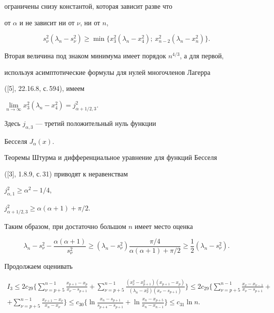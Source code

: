 ограничены снизу константой, которая зависит разве что 


от $\alpha$ и не зависит ни от $\nu$, ни от $n$,


$$


s^2_\nu(\lambda_n-s^2_\nu)\geq\min\{ 


x^2_3(\lambda_n-x^2_4);\ x^2_{n-2}(\lambda_n-x^2_n)\}.


$$


Вторая величина под знаком минимума имеет порядок $n^{4/3}$, а для первой,


используя асимптотические формулы для нулей многочленов Лагерра 


([5], 22.16.8, с.\,594), имеем


$\lim\limits_{n\to\infty}x^2_3(\lambda_n-x^2_4)=j^2_{\alpha+1/2,3}$.


Здесь $j_{\alpha,3}$ --- третий положительный нуль функции 


Бесселя $J_\alpha(x)$.


Теоремы Штурма и дифференциальное уравнение для функций Бесселя 


([3], 1.8.9, с.\,31) приводят к неравенствам


$j^2_{\alpha,1}\geq\alpha^2-1/4$,


$j^2_{\alpha+1/2,3}\geq\alpha(\alpha+1)+\pi/2$.


Таким образом, при достаточно большом $n$ имеет место оценка


$$


\lambda_{n}-s^2_\nu-\frac{\alpha(\alpha+1)}{s^2_\nu}\geq


(\lambda_{n}-s^2_\nu)\frac{\pi/4}{\alpha(\alpha+1)+\pi/2}\geq


\frac12(\lambda_{n}-s^2_\nu).


$$


Продолжаем оценивать


\begin{multline*}


I_3\leq2c_{29}\bigg\{


\sum_{\nu=p+5}^{n-1}\frac{x_{p+1}-x_p}{x_\nu-s_{p+1}}+


\sum_{\nu=p+5}^{n-1}\frac{(x^2_\nu-x^2_{p+1})(x_{p+1}-x_p)}


{(\lambda_n-x^2_\nu)(x_\nu-s_{p+1})}


\bigg\}\leq2c_{29}\bigg\{


\sum_{\nu=p+5}^{n-1}\frac{x_\nu-x_{\nu-1}}{x_\nu-s_{p+1}}+\\


%


+\sum_{\nu=p+5}^{n-1}\frac{x_{\nu+1}-x_\nu}{x_n-x_\nu}


\bigg\}\leq c_{30}\bigg\{


\ln\frac{x_n-s_{p+1}}{s_{p+4}-s_{p+1}}+


\ln\frac{x_n-x_{p+5}}{x_n-x_{n-1}}


\bigg\}\leq c_{31}\ln n.


\end{multline*}


